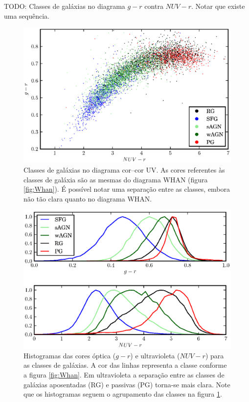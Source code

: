 TODO: Classes de galáxias no diagrama $g-r$ contra $NUV-r$. Notar que existe uma
sequência.

\begin{figure}
	\includegraphics{figuras/uvcolor-color-class.eps}
	\caption[Diagrama cor--cor UV de acordo com o tipo de galáxia.]
	{Classes de galáxias no diagrama cor--cor UV. As cores referentes às classes de
	galáxia são as mesmas do diagrama WHAN (figura \ref{fig:Whan}). É possível
	notar uma separação entre as classes, embora não tão clara quanto no diagrama
	WHAN.}
	\label{fig:ColorClass}
\end{figure}

\begin{figure}
	\includegraphics{figuras/histo_galtype_color.eps}
	\caption[Histogramas de cores para as classes de galáxias.]
	{Histogramas das cores óptica ($g-r$) e ultravioleta ($NUV-r$) para as
	classes de galáxias. A cor das linhas representa a classe conforme a figura
	\ref{fig:Whan}. Em ultravioleta a separação entre as classes de galáxias
	aposentadas (RG) e passivas (PG) torna-se mais clara. Note que os histogramas
	seguem o agrupamento das classes na figura \ref{fig:ColorClass}.}
	\label{fig:HistogramaCorClasse}
\end{figure}


